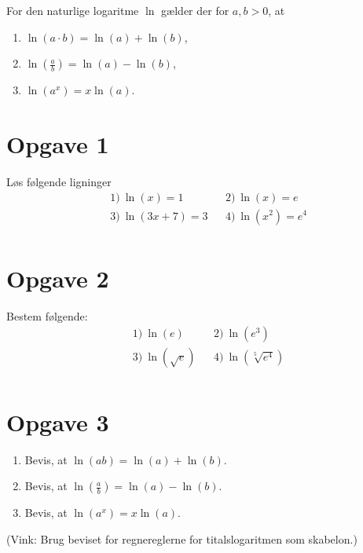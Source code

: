 \begin{setn}
For den naturlige logaritme $\ln$ gælder der for $a,b>0$, at
\begin{enumerate}[label=\roman*)]
\item $\ln(a\cdot b) = \ln(a) + \ln(b)$,
\item $\ln(\frac{a}{b}) = \ln(a)-\ln(b)$,
\item $\ln(a^x) = x\ln(a)$.
\end{enumerate}
\end{setn}



\section*{Opgave 1}
Løs følgende ligninger
\begin{align*}
&1) \ \ln(x)=1   &&2) \ \ln(x)=e    \\
&3) \ \ln(3x+7) = 3   &&4) \  \ln(x^2) = e^4   \\
\end{align*}
\section*{Opgave 2}
Bestem følgende:
\begin{align*}
&1) \  \ln(e)  &&2) \  \ln(e^3)    \\
&3) \  \ln(\sqrt{e})  &&4) \ \ln(\sqrt[5]{e^4})      \\
\end{align*}


\section*{Opgave 3}
\begin{enumerate}[label=\roman*)]
\item Bevis, at  $\ln(ab) = \ln(a)+\ln(b).$
\item Bevis, at  $\ln(\frac{a}{b}) = \ln(a)-\ln(b)$.
\item Bevis, at  $\ln(a^x) = x\ln(a)$.
\end{enumerate}
(Vink: Brug beviset for regnereglerne for titalslogaritmen som skabelon.)

